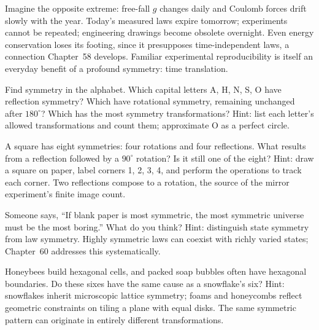 \begin{thought}
Imagine the opposite extreme: free-fall \(g\) changes daily and Coulomb forces drift slowly with the year. Today's measured laws expire tomorrow; experiments cannot be repeated; engineering drawings become obsolete overnight. Even energy conservation loses its footing, since it presupposes time-independent laws, a connection Chapter~58 develops. Familiar experimental reproducibility is itself an everyday benefit of a profound symmetry: time translation.
\end{thought}

\begin{puzzles}
\item Find symmetry in the alphabet. Which capital letters A, H, N, S, O have reflection symmetry? Which have rotational symmetry, remaining unchanged after \(180^\circ\)? Which has the most symmetry transformations? Hint: list each letter's allowed transformations and count them; approximate O as a perfect circle.
\item A square has eight symmetries: four rotations and four reflections. What results from a reflection followed by a \(90^\circ\) rotation? Is it still one of the eight? Hint: draw a square on paper, label corners 1, 2, 3, 4, and perform the operations to track each corner. Two reflections compose to a rotation, the source of the mirror experiment's finite image count.
\item Someone says, ``If blank paper is most symmetric, the most symmetric universe must be the most boring.'' What do you think? Hint: distinguish state symmetry from law symmetry. Highly symmetric laws can coexist with richly varied states; Chapter~60 addresses this systematically.
\item Honeybees build hexagonal cells, and packed soap bubbles often have hexagonal boundaries. Do these sixes have the same cause as a snowflake's six? Hint: snowflakes inherit microscopic lattice symmetry; foams and honeycombs reflect geometric constraints on tiling a plane with equal disks. The same symmetric pattern can originate in entirely different transformations.
\end{puzzles}
